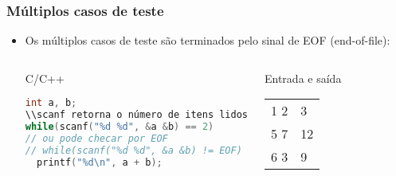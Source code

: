 \begin{frame} [fragile]
  \frametitle{Múltiplos casos de teste}
    \begin{itemize}
      \item {\small Os múltiplos casos de teste são terminados pelo sinal de EOF (end-of-file):}
      \begin{columns}
      \begin{block:ie}{C/C++}
	\begin{lstlisting}[language=c]
int a, b;
\\scanf retorna o número de itens lidos
while(scanf("%d %d", &a &b) == 2)
// ou pode checar por EOF
// while(scanf("%d %d", &a &b) != EOF)
  printf("%d\n", a + b);
	\end{lstlisting}
      \end{block:ie}

      \begin{block:ie}{Entrada e saída}
	\begin{tabularx}{\textwidth}{|X|X|}
	  1 2&3\\5 7&12\\6 3&9
	\end{tabularx}
      \end{block:ie}
    \end{columns}
  \end{itemize}
\end{frame}

